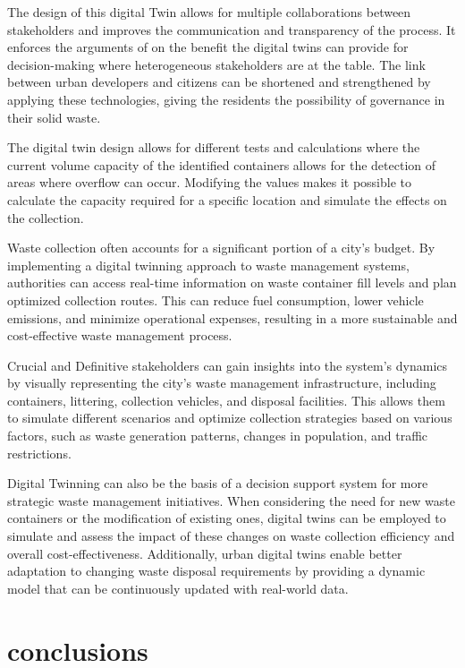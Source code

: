 \documentclass[authoryear,preprint,review,12pt]{elsarticle}
\begin{document}
    The design of this digital Twin allows for multiple collaborations between stakeholders and improves the communication and transparency of the process. It enforces the arguments of \citet{hamalainenUrbanDevelopmentDynamic2021} on the benefit the digital twins can provide for decision-making where heterogeneous stakeholders are at the table. The link between urban developers and citizens can be shortened and strengthened by applying these technologies, giving the residents the possibility of governance in their solid waste.

    The digital twin design allows for different tests and calculations where the current volume capacity of the identified containers allows for the detection of areas where overflow can occur. Modifying the values makes it possible to calculate the capacity required for a specific location and simulate the effects on the collection.

    Waste collection often accounts for a significant portion of a city's budget. By implementing a digital twinning approach to waste management systems, authorities can access real-time information on waste container fill levels and plan optimized collection routes. This can reduce fuel consumption, lower vehicle emissions, and minimize operational expenses, resulting in a more sustainable and cost-effective waste management process.

    Crucial and Definitive stakeholders can gain insights into the system's dynamics by visually representing the city's waste management infrastructure, including containers, littering, collection vehicles, and disposal facilities. This allows them to simulate different scenarios and optimize collection strategies based on various factors, such as waste generation patterns, changes in population, and traffic restrictions.

    Digital Twinning can also be the basis of a decision support system for more strategic waste management initiatives. When considering the need for new waste containers or the modification of existing ones, digital twins can be employed to simulate and assess the impact of these changes on waste collection efficiency and overall cost-effectiveness. Additionally, urban digital twins enable better adaptation to changing waste disposal requirements by providing a dynamic model that can be continuously updated with real-world data.

    \section{conclusions} \label{sec:conclusions}
\end{document}
